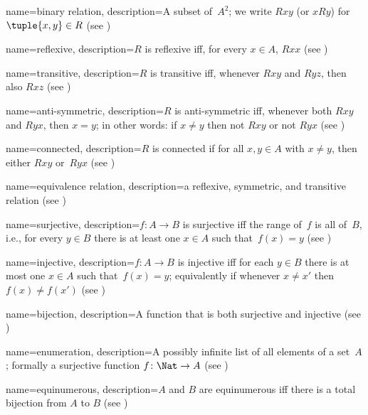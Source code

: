  {
  name=binary relation,
  description={A subset of~$A^{2}$; we write $Rxy$ (or $xRy$) for
    $\tuple{x, y} \in R$ (see )} }

 {
  name=reflexive,
  description={$R$ is reflexive iff, for every $x \in A$, $Rxx$ (see
    )} }

 {
  name=transitive,
  description={$R$ is transitive iff, whenever $Rxy$ and $Ryz$, then
    also $Rxz$ (see )} }

 {
  name=anti-symmetric,
  description={$R$ is anti-symmetric iff, whenever both $Rxy$ and
    $Ryx$, then $x=y$; in other words: if $x\neq y$ then not $Rxy$ or
    not $Ryx$ (see )} }

 {
  name=connected,
  description={$R$ is connected if for all $x, y\in A$
    with $x \neq y$, then either $Rxy$ or~$Ryx$ (see
    )} }

 {
  name={equivalence relation}, 
  description={a reflexive, symmetric, and transitive relation (see
    )} }

 {
  name={surjective},
  description={$f \colon A \to B$ is {surjective} iff the
    range of~$f$ is all of~$B$, i.e., for every $y \in B$ there is at
    least one $x \in A$ such that~$f(x) = y$ (see
    )} }

 {
  name={injective}, 
  description={$f \colon A \to B$ is {injective} iff for
    each $y \in B$ there is at most one $x \in A$ such that~$f(x) =
    y$; equivalently if whenever $x \neq x'$ then $f(x) \neq f(x')$
    (see )} }

 {
  name={bijection},  
  description={A function that is both {surjective} and
    {injective} (see )} }

 {
  name=enumeration,  
  description={A possibly infinite list of all
    {element}s of a set~$A$; formally a surjective function
    $f\colon \Nat \to A$ (see )} }

 {
  name=equinumerous,
  description={$A$ and $B$ are equinumerous iff there is a total
    bijection from $A$ to $B$ (see )} }

